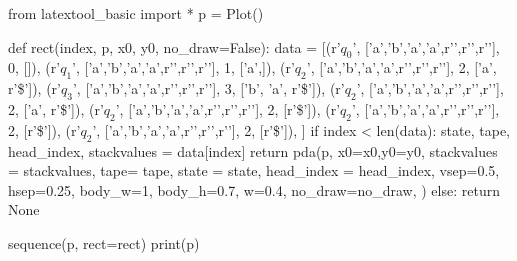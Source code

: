 \begin{python}
from latextool_basic import *
p = Plot()

def rect(index, p, x0, y0, no_draw=False):
    data = [(r'$q_0$',
             ['a','b','a','a',r'\SPACE',r'\SPACE',r'\SPACE'],
             0,
             []),
            (r'$q_1$',
             ['a','b','a','a',r'\SPACE',r'\SPACE',r'\SPACE'],
             1,
             ['a',]), 
            (r'$q_2$',
             ['a','b','a','a',r'\SPACE',r'\SPACE',r'\SPACE'],
             2,
             ['a', r'\$']),
            (r'$q_3$',
             ['a','b','a','a',r'\SPACE',r'\SPACE',r'\SPACE'],
             3,
             ['b', 'a', r'\$']),
            (r'$q_2$',
             ['a','b','a','a',r'\SPACE',r'\SPACE',r'\SPACE'],
             2,
             ['a', r'\$']),
            (r'$q_2$',
             ['a','b','a','a',r'\SPACE',r'\SPACE',r'\SPACE'],
             2,
             [r'\$']),
            (r'$q_2$',
             ['a','b','a','a',r'\SPACE',r'\SPACE',r'\SPACE'],
             2,
             [r'\$']),
            (r'$q_2$',
             ['a','b','a','a',r'\SPACE',r'\SPACE',r'\SPACE'],
             2,
             [r'\$']),
            ]
    if index < len(data):
        state, tape, head_index, stackvalues = data[index]    
        return pda(p,
               x0=x0,y0=y0,
               stackvalues = stackvalues,
               tape= tape,
               state = state,
               head_index = head_index,
               vsep=0.5, hsep=0.25,
               body_w=1, body_h=0.7, w=0.4,
               no_draw=no_draw,
               )
    else:
        return None

sequence(p, rect=rect)
print(p)
\end{python}


